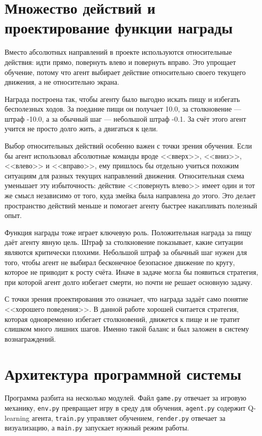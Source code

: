 \section{Множество действий и проектирование функции награды}

Вместо абсолютных направлений в проекте используются относительные действия: идти прямо, повернуть влево и повернуть вправо. Это упрощает обучение, потому что агент выбирает действие относительно своего текущего движения, а не относительно экрана.

Награда построена так, чтобы агенту было выгодно искать пищу и избегать бесполезных ходов. За поедание пищи он получает 10.0, за столкновение --- штраф -10.0, а за обычный шаг --- небольшой штраф -0.1. За счёт этого агент учится не просто долго жить, а двигаться к цели.

Выбор относительных действий особенно важен с точки зрения обучения. Если бы агент использовал абсолютные команды вроде <<вверх>>, <<вниз>>, <<влево>> и <<вправо>>, ему пришлось бы отдельно учиться похожим ситуациям для разных текущих направлений движения. Относительная схема уменьшает эту избыточность: действие <<повернуть влево>> имеет один и тот же смысл независимо от того, куда змейка была направлена до этого. Это делает пространство действий меньше и помогает агенту быстрее накапливать полезный опыт.

Функция награды тоже играет ключевую роль. Положительная награда за пищу даёт агенту явную цель. Штраф за столкновение показывает, какие ситуации являются критически плохими. Небольшой штраф за обычный шаг нужен для того, чтобы агент не выбирал бесконечное безопасное движение по кругу, которое не приводит к росту счёта. Иначе в задаче могла бы появиться стратегия, при которой агент долго избегает смерти, но почти не решает основную задачу.

С точки зрения проектирования это означает, что награда задаёт само понятие <<хорошего поведения>>. В данной работе хорошей считается стратегия, которая одновременно избегает столкновений, движется к пище и не тратит слишком много лишних шагов. Именно такой баланс и был заложен в систему вознаграждений.

\section{Архитектура программной системы}

Программа разбита на несколько модулей. Файл \texttt{game.py} отвечает за игровую механику, \texttt{env.py} превращает игру в среду для обучения, \texttt{agent.py} содержит Q-learning агента, \texttt{train.py} управляет обучением, \texttt{render.py} отвечает за визуализацию, а \texttt{main.py} запускает нужный режим работы.

